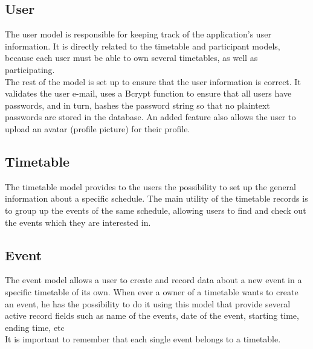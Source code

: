 \subsection{User}
\vspace{-5mm}
The user model is responsible for keeping track of the application's user information. It is directly related to the timetable and participant models, because each user must be able to own several timetables, as well as participating.\\ 
The rest of the model is set up to ensure that the user information is correct. It validates the user e-mail, uses a Bcrypt function to ensure that all users have passwords, and in turn, hashes the password string so that no plaintext passwords are stored in the database. An added feature also allows the user to upload an avatar (profile picture) for their profile. \cite{wiki:RoR}

\subsection{Timetable}
\vspace{-5mm}
The timetable model provides to the users the possibility to set up the general information about a specific schedule. The main utility of the timetable records is to group up the events of the same schedule, allowing users to find and check out the events which they are interested in.
\subsection{Event}
\vspace{-5mm}
The event model allows a user to create and record data about a new event in a specific timetable of its own. When ever a owner of a timetable wants to create an event, he has the possibility to do it using this model that provide several active record fields such as name of the events, date of the event, starting time, ending time, etc \\
It is important to remember that each single event belongs to a timetable.

